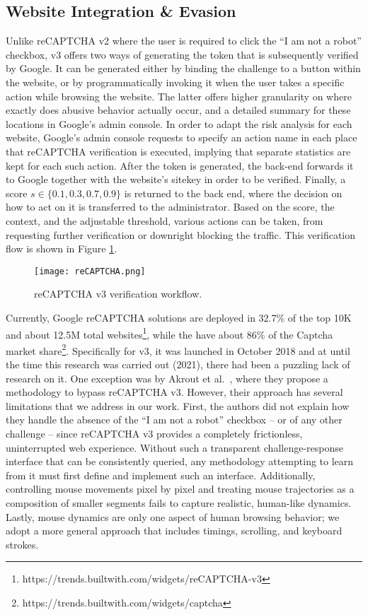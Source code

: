 \subsection{Website Integration \& Evasion}
Unlike reCAPTCHA v2 where the user is required to click the ``I am not a robot'' checkbox, v3 offers two ways of generating the token that is subsequently verified by Google.
It can be generated either by binding the challenge to a button within the website, or by programmatically invoking it when the user takes a specific action while browsing the website.
The latter offers higher granularity on where exactly does abusive behavior actually occur, and a detailed summary for these locations in Google's admin console.
In order to adapt the risk analysis for each website, Google's admin console requests to specify an action name in each place that reCAPTCHA verification is executed, implying that separate statistics are kept for each such action.
After the token is generated, the back-end forwards it to Google together with the website's sitekey in order to be verified.
Finally, a score $s \in \{0.1,0.3,0.7,0.9\}$ is returned to the back end, where the decision on how to act on it is transferred to the administrator.
Based on the score, the context, and the adjustable threshold, various actions can be taken, from requesting further verification or downright blocking the traffic.
This verification flow is shown in Figure \ref{flow}.

\begin{figure}[htbp]
\centerline{\texttt{[image: reCAPTCHA.png]}}
\caption{reCAPTCHA v3 verification workflow.}
\label{flow}
\end{figure}

Currently, Google reCAPTCHA solutions are deployed in 32.7\% of the top 10K and about 12.5M total websites\footnote{https://trends.builtwith.com/widgets/reCAPTCHA-v3}, while the have about 86\% of the Captcha market share\footnote{https://trends.builtwith.com/widgets/captcha}.
Specifically for v3, it was launched in October 2018 and at until the time this research was carried out (2021), there had been a puzzling lack of research on it.
One exception was by Akrout et al.~\cite{akrout2019hacking}, where they propose a methodology to bypass reCAPTCHA v3.
However, their approach has several limitations that we address in our work.
First, the authors did not explain how they handle the absence of the ``I am not a robot'' checkbox -- or of any other challenge -- since reCAPTCHA v3 provides a completely frictionless, uninterrupted web experience.
Without such a transparent challenge-response interface that can be consistently queried, any methodology attempting to learn from it must first define and implement such an interface.
Additionally, controlling mouse movements pixel by pixel and treating mouse trajectories as a composition of smaller segments fails to capture realistic, human-like dynamics.
Lastly, mouse dynamics are only one aspect of human browsing behavior; we adopt a more general approach that includes timings, scrolling, and keyboard strokes.

